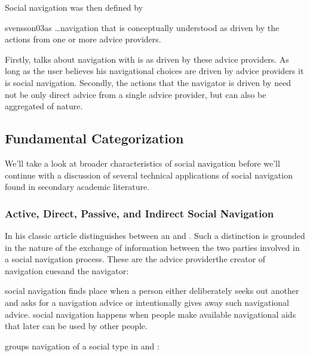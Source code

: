 Social navigation was then defined by
\begin{fullquote}[p.~20]{svensson03}{as}
  \dots navigation that is conceptually understood as driven by the actions
  from one or more advice providers.
\end{fullquote}

Firstly, \citeauthor{svensson03} talks about navigation with is
 as driven by these advice providers. As long as
the user believes his navigational choices are driven by advice providers it
is social navigation. Secondly, the actions that the navigator is driven by
need not be only direct advice from a single advice provider, but can also be
aggregated of nature.

\subsection{Fundamental Categorization}

We'll take a look at broader characteristics of social navigation
before we'll continue with a discussion of several technical applications of
social navigation found in secondary academic literature.

\subsubsection{Active, Direct, Passive, and Indirect Social Navigation}

In his classic article \citet{dieberger97} distinguishes between an
 and .
Such a distinction is grounded in the nature of the exchange of information
between the two parties involved in a social navigation process.
These are the advice provider\dash{}the creator of navigation
cues\dash{}and the navigator:

\begin{items}
   social navigation finds place when a person either
    deliberately seeks out another and asks for a navigation advice or
    intentionally gives away such navigational advice.
   social navigation happens when people make available
    navigational aids that later can be used by other people.
\end{items}

\citeauthor{svensson03} groups navigation of a social type in
 and :

